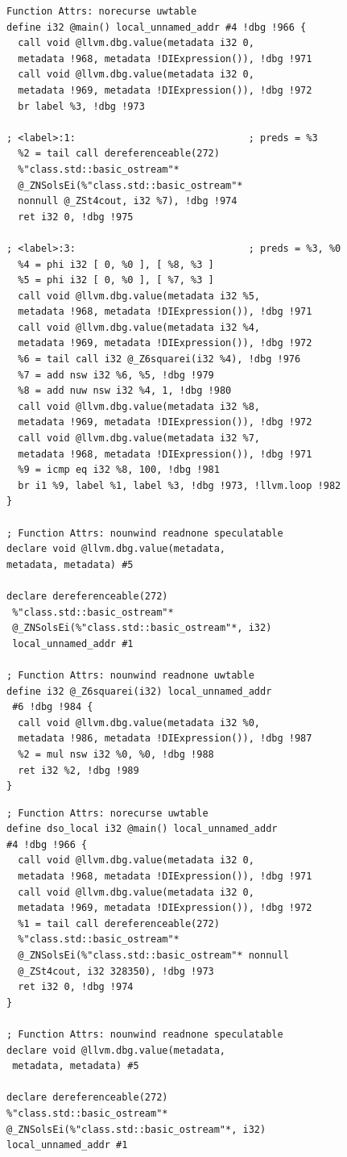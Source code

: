 \documentclass[12pt,oneside]{memoir}
\begin{document}
\begin{lstlisting}[frame=single,caption={Међурепрезентација без оптимизације целовитог програма}, captionpos=b]
 Function Attrs: norecurse uwtable
define i32 @main() local_unnamed_addr #4 !dbg !966 {
  call void @llvm.dbg.value(metadata i32 0, 
  metadata !968, metadata !DIExpression()), !dbg !971
  call void @llvm.dbg.value(metadata i32 0, 
  metadata !969, metadata !DIExpression()), !dbg !972
  br label %3, !dbg !973

; <label>:1:                              ; preds = %3
  %2 = tail call dereferenceable(272) 
  %"class.std::basic_ostream"* 
  @_ZNSolsEi(%"class.std::basic_ostream"* 
  nonnull @_ZSt4cout, i32 %7), !dbg !974
  ret i32 0, !dbg !975

; <label>:3:                              ; preds = %3, %0
  %4 = phi i32 [ 0, %0 ], [ %8, %3 ]
  %5 = phi i32 [ 0, %0 ], [ %7, %3 ]
  call void @llvm.dbg.value(metadata i32 %5, 
  metadata !968, metadata !DIExpression()), !dbg !971
  call void @llvm.dbg.value(metadata i32 %4, 
  metadata !969, metadata !DIExpression()), !dbg !972
  %6 = tail call i32 @_Z6squarei(i32 %4), !dbg !976
  %7 = add nsw i32 %6, %5, !dbg !979
  %8 = add nuw nsw i32 %4, 1, !dbg !980
  call void @llvm.dbg.value(metadata i32 %8, 
  metadata !969, metadata !DIExpression()), !dbg !972
  call void @llvm.dbg.value(metadata i32 %7, 
  metadata !968, metadata !DIExpression()), !dbg !971
  %9 = icmp eq i32 %8, 100, !dbg !981
  br i1 %9, label %1, label %3, !dbg !973, !llvm.loop !982
}

; Function Attrs: nounwind readnone speculatable
declare void @llvm.dbg.value(metadata, 
metadata, metadata) #5

declare dereferenceable(272)
 %"class.std::basic_ostream"* 
 @_ZNSolsEi(%"class.std::basic_ostream"*, i32) 
 local_unnamed_addr #1

; Function Attrs: nounwind readnone uwtable
define i32 @_Z6squarei(i32) local_unnamed_addr
 #6 !dbg !984 {
  call void @llvm.dbg.value(metadata i32 %0, 
  metadata !986, metadata !DIExpression()), !dbg !987
  %2 = mul nsw i32 %0, %0, !dbg !988
  ret i32 %2, !dbg !989
}
\end{lstlisting}

\begin{lstlisting}[frame=single,caption={Међурепрезентација са оптимизацијом целовитог програма}, captionpos=b]
; Function Attrs: norecurse uwtable
define dso_local i32 @main() local_unnamed_addr 
#4 !dbg !966 {
  call void @llvm.dbg.value(metadata i32 0, 
  metadata !968, metadata !DIExpression()), !dbg !971
  call void @llvm.dbg.value(metadata i32 0, 
  metadata !969, metadata !DIExpression()), !dbg !972
  %1 = tail call dereferenceable(272) 
  %"class.std::basic_ostream"* 
  @_ZNSolsEi(%"class.std::basic_ostream"* nonnull 
  @_ZSt4cout, i32 328350), !dbg !973
  ret i32 0, !dbg !974
}

; Function Attrs: nounwind readnone speculatable
declare void @llvm.dbg.value(metadata,
 metadata, metadata) #5

declare dereferenceable(272) 
%"class.std::basic_ostream"* 
@_ZNSolsEi(%"class.std::basic_ostream"*, i32) 
local_unnamed_addr #1

\end{lstlisting}
\end{document}
